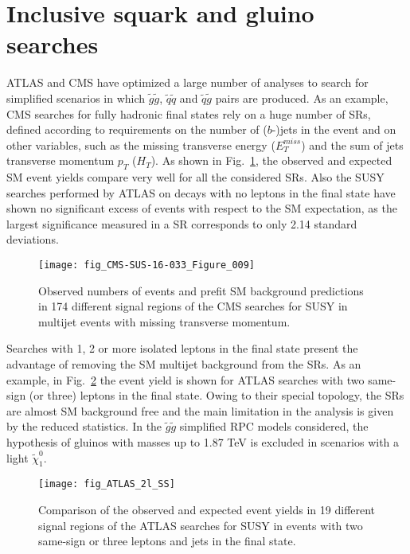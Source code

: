 \documentclass{ws-ijmpcs}
\begin{document}
\section{Inclusive squark and gluino searches}
ATLAS and CMS have optimized a large number of analyses to search for simplified scenarios in which $\tilde{g}\tilde{g}$, $\tilde{q}\tilde{q}$ and $\tilde{q}\tilde{g}$ pairs are produced.
As an example, CMS searches for fully hadronic final states \cite{CMS_0lep} rely on a huge number of SRs, defined according to requirements on the number of ($b$-)jets in the event and on other variables, such as the missing transverse energy ($E_T^{miss}$) and the sum of jets transverse momentum $p_T$ ($H_T$). As shown in Fig.~\ref{CMS0lep}, the observed and expected SM event yields compare very well for all the considered SRs. Also the SUSY searches performed by ATLAS on decays with no leptons in the final state \cite{ATLAS_0lep} have shown no significant excess of events with respect to the SM expectation, as the largest significance measured in a SR corresponds to only 2.14 standard deviations.

\begin{figure}[pb]
\centerline{\texttt{[image: fig\_CMS-SUS-16-033\_Figure\_009]}}
\vspace*{8pt}
\caption{Observed numbers of events and prefit SM background predictions in 174 different signal regions of the CMS searches for SUSY in multijet events with missing transverse momentum. \label{CMS0lep}}
\end{figure}

Searches with 1, 2 or more isolated leptons in the final state present the advantage of removing the SM multijet background from the SRs. As an example, in Fig.~\ref{ATLAS2lSS} the event yield is shown for ATLAS searches \cite{ATLAS_2lSS} with two same-sign (or three) leptons in the final state. Owing to their special topology, the SRs are almost SM background free and the main limitation in the analysis is given by the reduced statistics. In the $\tilde{g}\tilde{g}$ simplified RPC models considered, the hypothesis of gluinos with masses up to 1.87 TeV is excluded in scenarios with a light $\tilde{\chi}^0_1$.

\begin{figure}[pb]
\centerline{\texttt{[image: fig\_ATLAS\_2l\_SS]}}
\vspace*{8pt}
\caption{Comparison of the observed and expected event yields in 19 different signal regions of the ATLAS searches for SUSY in events with two same-sign or three leptons and jets in the final state. \label{ATLAS2lSS}}
\end{figure}
\end{document}
